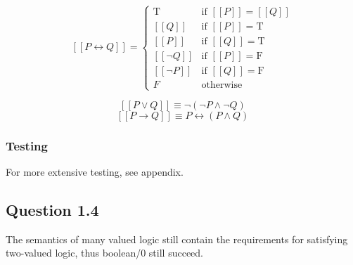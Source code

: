 $$ [[P \leftrightarrow Q]] = 
    \begin{cases}
        \textrm{T} & \textrm{if } [[P]] = [[Q]] \\
        [[Q]] & \textrm{if } [[P]] = \textrm{T} \\
        [[P]] & \textrm{if } [[Q]] = \textrm{T} \\
        [[\neg Q]] & \textrm{if } [[P]] = \textrm{F} \\
        [[\neg P]] & \textrm{if } [[Q]] = \textrm{F} \\
        F & \textrm{otherwise} 
    \end{cases}
$$

$$[[P \lor Q]] \equiv \neg (\neg P \land \neg Q)$$
$$[[P \to Q]] \equiv P \leftrightarrow (P \land Q) $$

\subsubsection*{Testing}
For more extensive testing, see appendix.

\subsection*{Question 1.4}
The semantics of many valued logic still contain the requirements for satisfying two-valued logic, thus boolean/0 still succeed.